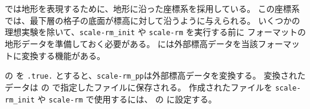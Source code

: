 \section{\SecBasicTopoSetting} \label{subsec:basic_usel_topo}

\scalerm では地形を表現するために、地形に沿った座標系を採用している。
この座標系では、最下層の格子の底面が標高に対して沿うように与えられる。
いくつかの理想実験を除いて、\verb|scale-rm_init| や \verb|scale-rm| を実行する前に \scalelib フォーマットの地形データを準備しておく必要がある。
\scalerm には外部標高データを当該フォーマットに変換する機能がある。

 の  を \verb|.true.| とすると、\verb|scale-rm_pp|は外部標高データを変換する。
変換されたデータは  の  で指定したファイルに保存される。
作成されたファイルを \verb|scale-rm_init| や \verb|scale-rm| で使用するには、 の  に設定する。

